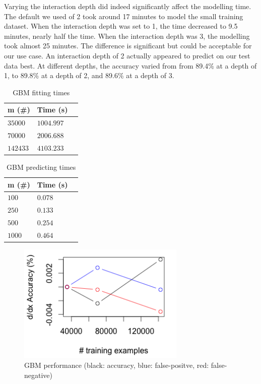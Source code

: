 \documentclass[twoside]{article}
\begin{document}
\begin{multicols}{2}
Varying the interaction depth did indeed significantly affect the modelling time. The default we used of 2 took around 17 minutes to model the small training dataset. When the interaction depth was set to 1, the time decreased to 9.5 minutes, nearly half the time. When the interaction depth was 3, the modelling took almost 25 minutes. The difference is significant but could be acceptable for our use case. An interaction depth of 2 actually appeared to predict on our test data best. At different depths, the accuracy varied from from 89.4\% at a depth of 1, to 89.8\% at a depth of 2, and 89.6\% at a depth of 3.

\begin{table}[H]
\caption{GBM fitting times}
\centering
\begin{tabular}{llr}
\toprule
m (\#) & Time (s) \\
\midrule
$35000$ & $1004.997$ \\
$70000$ & $2006.688$ \\
$142433$ & $4103.233$ \\
\bottomrule
\end{tabular}
\end{table}

\begin{table}[H]
\caption{GBM predicting times}
\centering
\begin{tabular}{llr}
\toprule
m (\#) & Time (s) \\
\midrule
$100$ & $0.078$ \\
$250$ & $0.133$ \\
$500$ & $0.254$ \\
$1000$ & $0.464$ \\
\bottomrule
\end{tabular}
\end{table}

\begin{figure}[H]
 \caption{GBM performance (black: accuracy, blue: false-positve, red: false-negative)}
  \centering
    \includegraphics[width=8cm]{../data/gbm_acc}
\end{figure}


\end{multicols}
\end{document}
